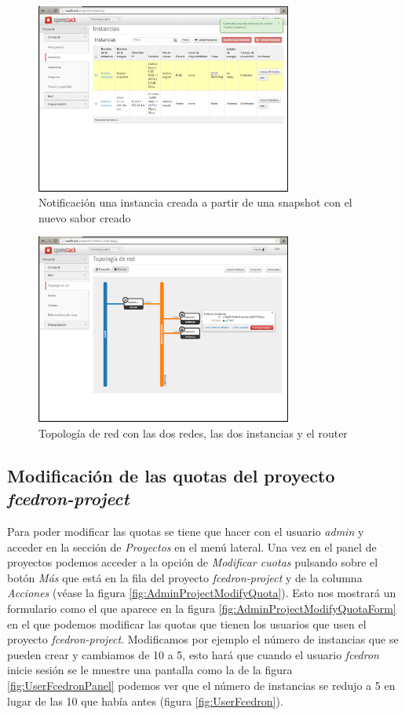 \documentclass{article}
\begin{document}
\begin{figure}[h]
  \centering
    \includegraphics[width=0.75\textwidth]{img/m_072.png}
  \caption{Notificación una instancia creada a partir de una snapshot con el nuevo sabor creado}
  \label{fig:LaunchingInstanceFromSnapshotCreate}
\end{figure}	

\begin{figure}[h]
  \centering
    \includegraphics[width=0.75\textwidth]{img/m_073.png}
  \caption{Topología de red con las dos redes, las dos instancias y el router}
  \label{fig:NetworkFull}
\end{figure}	

\clearpage
\subsection{Modificación de las quotas del proyecto \emph{fcedron-project}}
	Para poder modificar las quotas se tiene que hacer con el usuario \emph{admin} y acceder en la sección de \emph{Proyectos} en el menú lateral. Una vez en el panel de proyectos podemos acceder a la opción de \emph{Modificar cuotas} pulsando sobre el botón \emph{Más} que está en la fila del proyecto \emph{fcedron-project} y de la columna \emph{Acciones} (véase la figura \ref{fig:AdminProjectModifyQuota}). Esto nos mostrará un formulario como el que aparece en la figura \ref{fig:AdminProjectModifyQuotaForm} en el que podemos modificar las quotas que tienen los usuarios que usen el proyecto \emph{fcedron-project}. Modificamos por ejemplo el número de instancias que se pueden crear y cambiamos de 10 a 5, esto hará que cuando el usuario \emph{fcedron} inicie sesión se le muestre una pantalla como la de la figura \ref{fig:UserFcedronPanel} podemos ver que el número de instancias se redujo a 5 en lugar de las 10 que había antes (figura \ref{fig:UserFcedron}).
\end{document}
